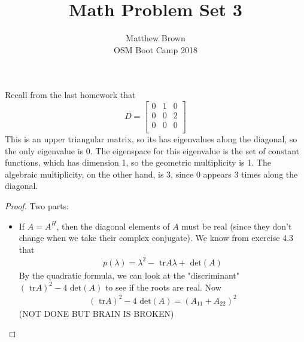 \documentclass[12pt]{article}
\newenvironment{problem}[2][Problem]{\begin{trivlist}
\item[\hskip \labelsep {\bfseries #1}\hskip \labelsep {\bfseries #2.}]}{\end{trivlist}}
\theoremstyle{definition}
\theoremstyle{definition}
\theoremstyle{definition}
\theoremstyle{definition}
\begin{document}
\title{Math Problem Set 3}
\author{Matthew Brown\\ 
OSM Boot Camp 2018} %
 
\maketitle
 
\begin{problem}{4.2}
Recall from the last homework that 
$$
D = \begin{bmatrix}
0 & 1 & 0\\
0 & 0 & 2\\
0 & 0 & 0\\
\end{bmatrix}
$$
This is an upper triangular matrix, so its has eigenvalues along the diagonal, so the only eigenvalue is 0. The eigenspace for this eigenvalue is the set of constant functions, which has dimension 1, so the geometric multiplicity is 1. The algebraic multiplicity, on the other hand, is 3, since 0 appears 3 times along the diagonal.
\end{problem}

\begin{problem}{4.4}
\begin{proof} Two parts: \\
\begin{itemize}
\item If $A = A^H$, then the diagonal elements of $A$ must be real (since they don't change when we take their complex conjugate). We know from exercise 4.3 that 
\begin{align*}
p(\lambda ) = \lambda^2 - \text{ tr}A\lambda + \text{ det} (A)
\end{align*}
By the quadratic formula, we can look at the "discriminant" $(\text{ tr}A)^2 - 4\text{ det} (A)$ to see if the roots are real. Now 
\begin{align*}
(\text{ tr}A)^2 - 4\text{ det} (A) = (A_11 + A_22)^2
\end{align*}
(NOT DONE BUT BRAIN IS BROKEN)
\end{itemize}
\end{proof}
\end{problem}
\end{document}
